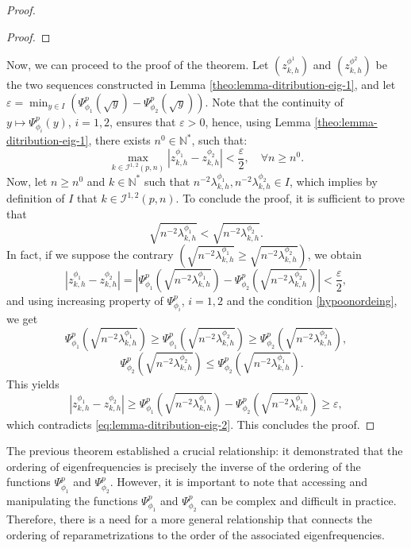 \documentclass[11pt]{article}
\begin{document}
\begin{proof}
\begin{proof}
\end{proof}
Now, we can proceed to the proof of the theorem. Let $(z_{k,h}^{\phi^1})$ and $(z_{k,h}^{\phi^2})$ be the two sequences constructed in Lemma \ref{theo:lemma-ditribution-eig-1}, and let $\varepsilon = \min_{y\in I} \left( \Psi_{\phi_1}^{p}(\sqrt{y})- \Psi^{p}_{\phi_2}(\sqrt{y})\right)$. Note that the continuity of $y \mapsto \Psi^{p}_{\phi_i}(y)$, $i=1,2$, ensures that $\varepsilon > 0$, hence, using Lemma \ref{theo:lemma-ditribution-eig-1}, there exists $n^0 \in \mathbb{N}^*$, such that:
\begin{equation}\label{eq:lemma-ditribution-eig-2}
\max_{k \in \mathcal{I}^{1,2}(p,n)} \left| z_{k,h}^{\phi_1}-   z_{k,h}^{\phi_2}  \right|< \frac{\varepsilon}{2}, \quad \forall n \geq n^0.
\end{equation}
Now, let $n \geq n^0$ and $k \in \mathbb{N}^*$ such that $n^{-2}\lambda_{k,h}^{\phi_1},n^{-2}\lambda_{k,h}^{\phi_2}\in I$, which implies by definition of $I$ that $k\in \mathcal{I}^{1,2}(p,n)$. To conclude the proof, it is sufficient to prove that
$$
\sqrt{n^{-2}\lambda_{k,h}^{\phi_1}}<\sqrt{n^{-2}\lambda_{k,h}^{\phi_2}}.
$$
In fact, if we suppose the contrary $\left(\sqrt{n^{-2}\lambda_{k,h}^{\phi_1}}\geq \sqrt{n^{-2}\lambda_{k,h}^{\phi_2}}\right)$, we obtain
$$ 
\left| z_{k,h}^{\phi_1}-   z_{k,h}^{\phi_2}  \right|= \left| \Psi_{\phi_1}^{p}\left(\sqrt{n^{-2}\lambda_{k,h}^{\phi_1} }\right)-\Psi^{p}_{\phi_2}\left(\sqrt{n^{-2}\lambda_{k,h}^{\phi_2}} \right)\right|<\frac{\varepsilon}{2},
$$
and using increasing property of $\Psi_{\phi_i}^p$, $i=1,2$ and the condition \eqref{hypoonordeing}, we get
$$
\Psi_{\phi_1}^{p}\left(\sqrt{n^{-2}\lambda_{k,h}^{\phi_1}} \right)\geq \Psi_{\phi_1}^{p}\left(\sqrt{n^{-2}\lambda_{k,h}^{\phi_2}} \right)\geq \Psi^{p}_{\phi_2}\left(\sqrt{n^{-2}\lambda_{k,h}^{\phi_2}} \right), $$ $$\quad \Psi^{p}_{\phi_2}\left(\sqrt{n^{-2}\lambda_{k,h}^{\phi_2}} \right)\leq \Psi^{p}_{\phi_2}\left(\sqrt{n^{-2}\lambda_{k,h}^{\phi_1}} \right).
$$
This yields
$$
\left| z_{k,h}^{\phi_1}-   z_{k,h}^{\phi_2}  \right|\geq \Psi_{\phi_1}^{p}\left(\sqrt{n^{-2}\lambda_{k,h}^{\phi_1}} \right)-\Psi^{p}_{\phi_2}\left(\sqrt{n^{-2}\lambda_{k,h}^{\phi_1}} \right)\geq  \varepsilon, 
$$
which contradicts \eqref{eq:lemma-ditribution-eig-2}. This concludes the proof.
\end{proof}



The previous theorem established a crucial relationship: it demonstrated that the ordering of eigenfrequencies is precisely the inverse of the ordering of the functions $\Psi_{\phi_1}^{p}$ and $\Psi_{\phi_2}^{p}$. However, it is important to note that accessing and manipulating the functions $\Psi_{\phi_1}^{p}$ and $\Psi_{\phi_2}^{p}$ can be complex and difficult in practice. Therefore, there is a need for a more general relationship that connects the ordering of reparametrizations to the order of the associated eigenfrequencies.
\end{document}
